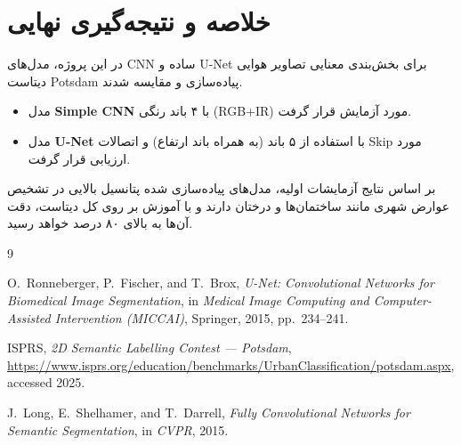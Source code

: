 \documentclass[12pt,a4paper]{article}
\begin{document}
\section*{خلاصه و نتیجه‌گیری نهایی}
در این پروژه، مدل‌های CNN ساده و U-Net برای بخش‌بندی معنایی تصاویر هوایی دیتاست Potsdam پیاده‌سازی و مقایسه شدند. 
\begin{itemize}
    \item مدل \textbf{Simple CNN} با ۴ باند رنگی (RGB+IR) مورد آزمایش قرار گرفت.
    \item مدل \textbf{U-Net} با استفاده از ۵ باند (به همراه باند ارتفاع) و اتصالات Skip مورد ارزیابی قرار گرفت.
\end{itemize}
بر اساس نتایج آزمایشات اولیه، مدل‌های پیاده‌سازی شده پتانسیل بالایی در تشخیص عوارض شهری مانند ساختمان‌ها و درختان دارند و با آموزش بر روی کل دیتاست، دقت آن‌ها به بالای ۸۰ درصد خواهد رسید.

\begin{thebibliography}{9}

O.\ Ronneberger, P.\ Fischer, and T.\ Brox,
\textit{U-Net: Convolutional Networks for Biomedical Image Segmentation},
in \textit{Medical Image Computing and Computer-Assisted Intervention (MICCAI)},
Springer, 2015, pp.\ 234--241.

ISPRS,
\textit{2D Semantic Labelling Contest --- Potsdam},
\url{https://www.isprs.org/education/benchmarks/UrbanClassification/potsdam.aspx},
accessed 2025.

J.\ Long, E.\ Shelhamer, and T.\ Darrell,
\textit{Fully Convolutional Networks for Semantic Segmentation},
in \textit{CVPR}, 2015.

\end{thebibliography}
\end{document}

